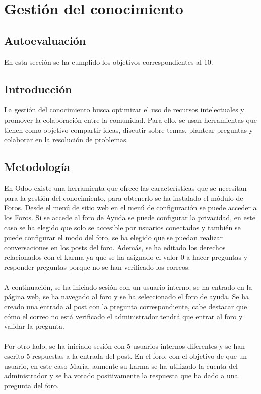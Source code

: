 \section{Gestión del conocimiento}
\subsection{Autoevaluación}
En esta sección se ha cumplido los objetivos correspondientes al 10.
\subsection{Introducción}
La gestión del conocimiento busca optimizar el uso de recursos intelectuales y promover la colaboración entre la comunidad. Para ello, se usan herramientas que tienen como objetivo compartir ideas, discutir sobre temas, plantear preguntas y colaborar en la resolución de problemas.
\subsection{Metodología}
En Odoo existe una herramienta que ofrece las características que se necesitan para la gestión del conocimiento, para obtenerlo se ha instalado el módulo de Foros. Desde el menú de sitio web en el menú de configuración se puede acceder a los Foros. Si se accede al foro de Ayuda se puede configurar la privacidad, en este caso se ha elegido que solo se accesible por usuarios conectados y también se puede configurar el modo del foro, se ha elegido que se puedan realizar conversaciones en los posts del foro. Además, se ha editado los derechos relacionados con el karma ya que se ha asignado el valor 0 a hacer preguntas y responder preguntas porque no se han verificado los correos. 
\paragraph{}
A continuación, se ha iniciado sesión con un usuario interno, se ha entrado en la página web, se ha navegado al foro y se ha seleccionado el foro de ayuda. Se ha creado una entrada al post con la pregunta correspondiente, cabe destacar que cómo el correo no está verificado el administrador tendrá que entrar al foro y validar la pregunta.
\paragraph{}
Por otro lado, se ha iniciado sesión con 5 usuarios internos diferentes y se han escrito 5 respuestas a la entrada del post. En el foro, con el objetivo de que un usuario, en este caso María, aumente su karma se ha utilizado la cuenta del administrador y se ha votado positivamente la respuesta que ha dado a una pregunta del foro. 
